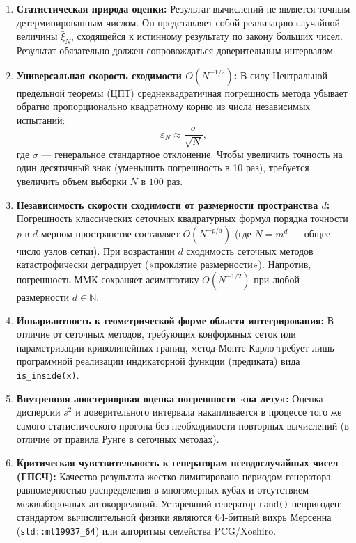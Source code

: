 \documentclass[11pt,a4paper]{article}
\begin{document}
\begin{enumerate}
    \item \textbf{Статистическая природа оценки:}
    Результат вычислений не является точным детерминированным числом. Он представляет собой реализацию случайной величины $\bar{\xi}_N$, сходящейся к истинному результату по закону больших чисел. Результат обязательно должен сопровождаться доверительным интервалом.
    
    \item \textbf{Универсальная скорость сходимости $O(N^{-1/2})$:}
    В силу Центральной предельной теоремы (ЦПТ) среднеквадратичная погрешность метода убывает обратно пропорционально квадратному корню из числа независимых испытаний:
    \begin{equation}
        \varepsilon_N \approx \frac{\sigma}{\sqrt{N}},
        \label{eq:clt_rate}
    \end{equation}
    где $\sigma$ --- генеральное стандартное отклонение. Чтобы увеличить точность на один десятичный знак (уменьшить погрешность в 10 раз), требуется увеличить объем выборки $N$ в $100$ раз.
    
    \item \textbf{Независимость скорости сходимости от размерности пространства $d$:}
    Погрешность классических сеточных квадратурных формул порядка точности $p$ в $d$-мерном пространстве составляет $O(N^{-p/d})$ (где $N = m^d$ --- общее число узлов сетки). При возрастании $d$ сходимость сеточных методов катастрофически деградирует («проклятие размерности»). Напротив, погрешность ММК сохраняет асимптотику $O(N^{-1/2})$ при любой размерности $d \in \mathbb{N}$.
    
    \item \textbf{Инвариантность к геометрической форме области интегрирования:}
    В отличие от сеточных методов, требующих конформных сеток или параметризации криволинейных границ, метод Монте-Карло требует лишь программной реализации индикаторной функции (предиката) вида \texttt{is\_inside(x)}.
    
    \item \textbf{Внутренняя апостериорная оценка погрешности «на лету»:}
    Оценка дисперсии $s^2$ и доверительного интервала накапливается в процессе того же самого статистического прогона без необходимости повторных вычислений (в отличие от правила Рунге в сеточных методах).
    
    \item \textbf{Критическая чувствительность к генераторам псевдослучайных чисел (ГПСЧ):}
    Качество результата жестко лимитировано периодом генератора, равномерностью распределения в многомерных кубах и отсутствием межвыборочных автокорреляций. Устаревший генератор \texttt{rand()} непригоден; стандартом вычислительной физики являются 64-битный вихрь Мерсенна (\texttt{std::mt19937\_64}) или алгоритмы семейства PCG/Xoshiro.
\end{enumerate}
\end{document}
